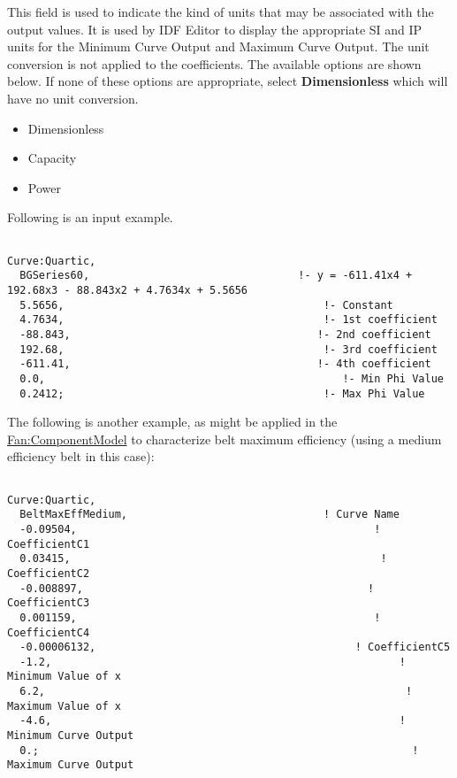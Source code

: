 This field is used to indicate the kind of units that may be associated with the output values. It is used by IDF Editor to display the appropriate SI and IP units for the Minimum Curve Output and Maximum Curve Output. The unit conversion is not applied to the coefficients. The available options are shown below. If none of these options are appropriate, select \textbf{Dimensionless} which will have no unit conversion.

\begin{itemize}
\item
  Dimensionless
\item
  Capacity
\item
  Power
\end{itemize}

Following is an input example.

\begin{lstlisting}

Curve:Quartic,
  BGSeries60,                                 !- y = -611.41x4 + 192.68x3 - 88.843x2 + 4.7634x + 5.5656
  5.5656,                                         !- Constant
  4.7634,                                         !- 1st coefficient
  -88.843,                                       !- 2nd coefficient
  192.68,                                         !- 3rd coefficient
  -611.41,                                       !- 4th coefficient
  0.0,                                               !- Min Phi Value
  0.2412;                                         !- Max Phi Value
\end{lstlisting}

The following is another example, as might be applied in the \hyperref[fancomponentmodel]{Fan:ComponentModel} to characterize belt maximum efficiency (using a medium efficiency belt in this case):

\begin{lstlisting}

Curve:Quartic,
  BeltMaxEffMedium,                               ! Curve Name
  -0.09504,                                               ! CoefficientC1
  0.03415,                                                 ! CoefficientC2
  -0.008897,                                             ! CoefficientC3
  0.001159,                                               ! CoefficientC4
  -0.00006132,                                         ! CoefficientC5
  -1.2,                                                       ! Minimum Value of x
  6.2,                                                         ! Maximum Value of x
  -4.6,                                                       ! Minimum Curve Output
  0.;                                                           ! Maximum Curve Output
\end{lstlisting}

